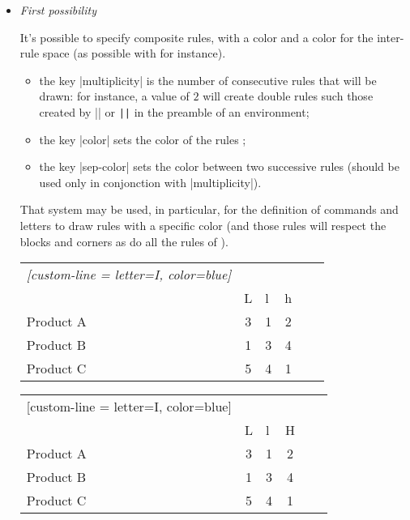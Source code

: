 \documentclass[dvipsnames]{article}%
\begin{document}
\begin{itemize}
\item \emph{First possibility}\par\nobreak

It's possible to specify composite rules, with a color and a color for the
inter-rule space (as possible with  for instance).

\begin{itemize}
\item the key |multiplicity| is the number of consecutive rules that will be
drawn: for instance, a value of $2$ will create double rules such those
created by |\hline\hline| or \verb+||+ in the preamble of an environment;

\item the key |color| sets the color of the rules ;

\item the key |sep-color| sets the color between two successive rules (should be
used only in conjonction with |multiplicity|).
\end{itemize}

\medskip
That system may be used, in particular, for the definition of commands and
letters to draw rules with a specific color (and those rules will respect the
blocks and corners as do all the rules of ). 

\medskip
\begin{Code}
\begin{NiceTabular}{lcIcIc}\emph{[custom-line = {letter=I, color=blue}]}
\hline
          &  \\
          & L & l & h \\
\hline
Product A & 3 & 1 & 2 \\
Product B & 1 & 3 & 4 \\
Product C & 5 & 4 & 1 \\
\hline
\end{NiceTabular}
\end{Code}


\begin{center}
\begin{NiceTabular}{lcIcIc}[custom-line = {letter=I, color=blue}]
\hline
          &  \\
          & L & l & H \\
\hline
Product A & 3 & 1 & 2 \\
Product B & 1 & 3 & 4 \\
Product C & 5 & 4 & 1 \\
\hline
\end{NiceTabular}
\end{center}



\end{itemize}
\end{document}
